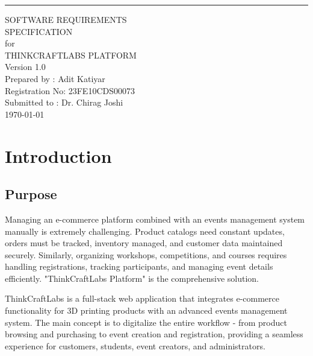 \documentclass{scrreprt}
\date{}
\def\myversion{1.0 }
\begin{document}
\begin{flushright}
    \rule{16cm}{5pt}\vskip1cm
    \begin{bfseries}
        \Huge{SOFTWARE REQUIREMENTS\\ SPECIFICATION}\\
        \vspace{1.5cm}
        for\\
        \vspace{1.5cm}
        THINKCRAFTLABS PLATFORM\\
        \vspace{1.5cm}
        \LARGE{Version \myversion}\\
        \vspace{1.5cm}
        Prepared by : Adit Katiyar\\
        Registration No: 23FE10CDS00073\\
        \vspace{1.5cm}
        Submitted to : Dr. Chirag Joshi\\
        \vspace{1.5cm}
        \today\\
    \end{bfseries}
\end{flushright}

\tableofcontents

\chapter{Introduction}

\section{Purpose}
Managing an e-commerce platform combined with an events management system manually is extremely challenging. Product catalogs need constant updates, orders must be tracked, inventory managed, and customer data maintained securely. Similarly, organizing workshops, competitions, and courses requires handling registrations, tracking participants, and managing event details efficiently. "ThinkCraftLabs Platform" is the comprehensive solution.

ThinkCraftLabs is a full-stack web application that integrates e-commerce functionality for 3D printing products with an advanced events management system. The main concept is to digitalize the entire workflow - from product browsing and purchasing to event creation and registration, providing a seamless experience for customers, students, event creators, and administrators.
\end{document}
